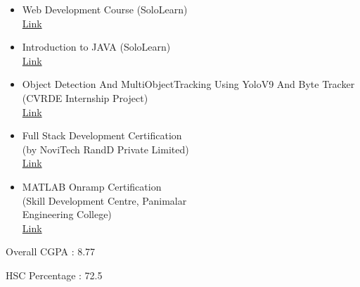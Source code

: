 \documentclass[10pt,a4paper,ragged2e,withhyper]{altacv}
\begin{document}
\begin{paracol}{2}
{}
\begin{itemize}
\item  Web Development Course (SoloLearn)
        \href{https://www.sololearn.com/en/certificates/CC-M3ETMWR8}{
        \\ \faLink Link
        }
\medskip
\item  Introduction to JAVA (SoloLearn) 
         \href{https://www.sololearn.com/en/certificates/CC-GDE8N1KN}{
        \\ \faLink Link
        }
\medskip
\item Object Detection And MultiObjectTracking Using YoloV9 And Byte
        Tracker \\(CVRDE Internship Project)
        \href{https://www.linkedin.com/in/derrick-albino-473297200/details/certifications/1735481251142/single-media-viewer/?profileId=ACoAADNMotcBg8G0jMW8aDRGmBbf5VLHZXToK3w}{ 
        \\ \faLink Link
        }
\medskip        
\item    Full Stack Development Certification \\(by NoviTech RandD Private Limited)
        \href{https://www.linkedin.com/in/derrick-albino-473297200/details/certifications/1735481493536/single-media-viewer/?profileId=ACoAADNMotcBg8G0jMW8aDRGmBbf5VLHZXToK3w}{ 
        \\ \faLink Link
        }
\medskip
\item  MATLAB Onramp Certification 
  \\(Skill Development Centre, Panimalar \\Engineering College)
   \href{https://www.linkedin.com/in/derrick-albino-473297200/details/certifications/1735480481672/single-media-viewer/?profileId=ACoAADNMotcBg8G0jMW8aDRGmBbf5VLHZXToK3w}{
   \\ \faLink Link
   }
\end{itemize}

\medskip




Overall CGPA : 8.77

\divider

HSC Percentage : 72.5


\end{paracol}
\end{document}
